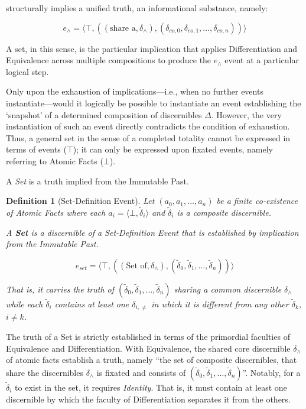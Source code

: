 \documentclass[11pt, a4paper]{article}
\theoremstyle{formalism}
\newtheorem{formalism}{Definition}
\begin{document}
structurally implies a unified truth, an informational substance, namely:

\begin{equation}
    e_\wedge = \langle \top, ((\text{share a}, \delta_\wedge), (\delta_{co,0}, \delta_{co,1}, \ldots, \delta_{co,n})) \rangle
\end{equation}

A set, in this sense, is the particular implication that applies Differentiation
and Equivalence across multiple compositions to produce the $e_\wedge$ event at a
particular logical step. 

Only upon the exhaustion of implications---i.e., when no further events
instantiate---would it logically be possible to instantiate an event
establishing the `snapshot' of a determined composition of discernibles
$\Delta$. However, the very instantiation of such an event directly contradicts
the condition of exhaustion. Thus, a general set in the sense of a completed
totality cannot be expressed in terms of events ($\top$); it can only be
expressed upon fixated events, namely referring to Atomic Facts ($\bot$).

A \textit{Set} is a truth implied from the Immutable Past.

\begin{formalism}[Set-Definition Event]
    Let $(a_0, a_1, \ldots, a_n)$ be a finite co-existence of Atomic Facts 
    where each $a_i = \langle \bot, \tilde{\delta}_i \rangle$ and $\tilde{\delta}_i$ is a
    composite discernible. 

    A \textbf{Set} is a discernible of a \textit{Set-Definition Event} that 
    is established by implication from the Immutable Past. 

    \begin{equation}
        e_{set} = \langle \top, ((\text{Set of}, \delta_\wedge), (\tilde{\delta}_0, \tilde{\delta}_1, \ldots, \tilde{\delta}_n)) \rangle
    \end{equation}

    That is, it carries the truth of $(\tilde{\delta}_0, \tilde{\delta}_1,
    \ldots, \tilde{\delta}_n)$ sharing a common discernible $\delta_\wedge$
    while each $\tilde{\delta}_i$ contains at least one $\delta_{i,\neq}$ in
    which it is different from any other $\tilde{\delta}_k$, $i \neq k$.

\end{formalism}

The truth of a Set is strictly established in terms of the primordial faculties
of Equivalence and Differentiation. With Equivalence, the shared core
discernible $\delta_\wedge$ of atomic facts establish a truth, namely ``the set
of composite discernibles, that share the discernibles $\delta_\wedge$ is
fixated and consists of $(\tilde{\delta}_0, \tilde{\delta}_1, \ldots,
\tilde{\delta}_n)$''. Notably, for a $\tilde{\delta}_i$ to exist in
the set, it requires \textit{Identity}. That is, it must contain at least
one discernible by which the faculty of Differentiation separates it from the
others.
\end{document}
